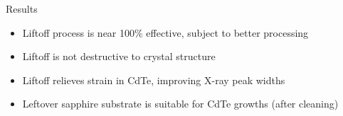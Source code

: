 \documentclass[]{beamer}%
\begin{document}
\begin{frame}
    \begin{columns}
\begin{column}{0.5\textwidth}
    \begin{block}{Results}
        \begin{itemize}[<+-| alert@+>]
            \item Liftoff process is near 100\% effective, subject to better processing
            \item Liftoff is not destructive to crystal structure
            \item Liftoff relieves strain in CdTe, improving X-ray peak widths
            \item Leftover sapphire substrate is suitable for CdTe growths (after cleaning)
        \end{itemize}
    \end{block}
\end{column}
\begin{column}{0.5\textwidth}
    \centering
     \\ \vspace{0.25cm}
\end{column}
        \end{columns}
\end{frame}
\end{document}
